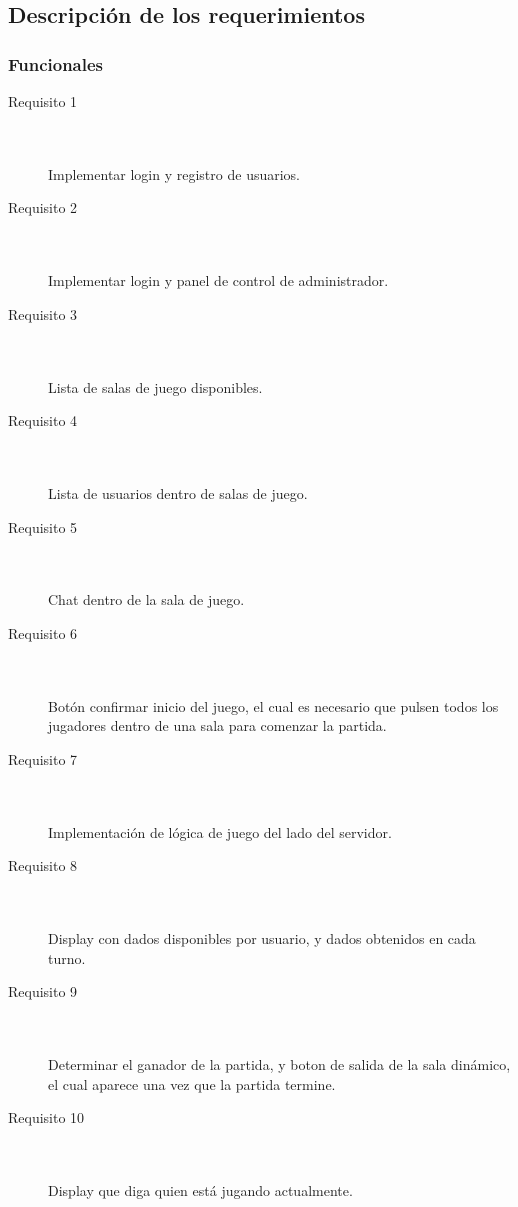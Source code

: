 \documentclass[a4paper,11pt]{article}
\begin{document}
\subsection{Descripción de los requerimientos}
\subsubsection{Funcionales}

\begin{description}
	\item[Requisito 1] \hfill \\ \\
	Implementar login y registro de usuarios.
	\item[Requisito 2] \hfill \\ \\
	Implementar login y panel de control de administrador.
	\item[Requisito 3] \hfill \\ \\
	Lista de salas de juego disponibles.
	\item[Requisito 4] \hfill \\ \\
	Lista de usuarios dentro de salas de juego.
	\item[Requisito 5] \hfill \\ \\
	Chat dentro de la sala de juego.
	\item[Requisito 6] \hfill \\ \\
	Botón confirmar inicio del juego, el cual es necesario que pulsen
	todos los jugadores dentro de una sala para comenzar la partida.
	\item[Requisito 7] \hfill \\ \\
	Implementación de lógica de juego del lado del servidor.
	\item[Requisito 8] \hfill \\ \\
	Display con dados disponibles por usuario, y dados obtenidos en cada 
	turno.
	\item[Requisito 9] \hfill \\ \\
	Determinar el ganador de la partida, y boton de salida de la sala
	dinámico, el cual aparece una vez que la partida termine.
	\item[Requisito 10] \hfill \\ \\
	Display que diga quien está jugando actualmente.
\end{description}
\end{document}
